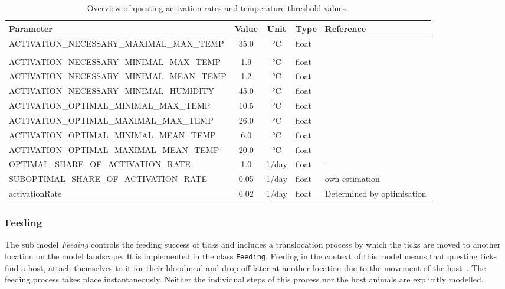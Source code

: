 \documentclass[a4paper, 11pt]{scrartcl}
\newcommand{\inlinecode}[1]{\texttt{\small #1}}
\begin{document}
\begin{table}[h!]
\caption[Overview of questing activation rates and temperature threshold values.]{Overview of questing activation rates and temperature threshold values.}
\label{tab:activation_parameters}
\begin{tabularx}{\textwidth}{lccll}
\toprule
\textbf{Parameter}	& \textbf{Value} & \textbf{Unit}	& \textbf{Type}	& \textbf{Reference} \\
\midrule
\multirow{2}{*}{\tiny{ACTIVATION\_NECESSARY\_MAXIMAL\_MAX\_TEMP}}	& \multirow{2}{*}{35.0}  & \multirow{2}{*}{°C} & \multirow{2}{*}{float} & ~\cite{Gray.2016} \\
												    &		&	 &		 & \textcite{MacLeod.1935} \\
\tiny{ACTIVATION\_NECESSARY\_MINIMAL\_MAX\_TEMP}	&  1.9  & °C & float & \textcite{Perret.2000} \\
\tiny{ACTIVATION\_NECESSARY\_MINIMAL\_MEAN\_TEMP}&  1.2 	& °C & float & \textcite{Perret.2000} \\
\tiny{ACTIVATION\_NECESSARY\_MINIMAL\_HUMIDITY}	& 45.0  & °C & float & \textcite{Greenfield.2011} \\
\tiny{ACTIVATION\_OPTIMAL\_MINIMAL\_MAX\_TEMP}	& 10.5 	& °C & float & \textcite{Perret.2000} \\
\tiny{ACTIVATION\_OPTIMAL\_MAXIMAL\_MAX\_TEMP}	& 26.0  & °C & float & \textcite{Greenfield.2011} \\
\tiny{ACTIVATION\_OPTIMAL\_MINIMAL\_MEAN\_TEMP}	&  6.0  & °C & float & \textcite{Gilbert.2014}	\\
\tiny{ACTIVATION\_OPTIMAL\_MAXIMAL\_MEAN\_TEMP}	& 20.0 	& °C & float & \tiny{\textcite{Kubiak.2006}} \\
\midrule
\tiny{OPTIMAL\_SHARE\_OF\_ACTIVATION\_RATE}		&  1.0  & 1/day & float	& - \\
\tiny{SUBOPTIMAL\_SHARE\_OF\_ACTIVATION\_RATE}	&  0.05	& 1/day & float	& own estimation \\
\small{activationRate}	   						&  0.02 & 1/day & float	& \small{Determined by optimisation} \\
\bottomrule
\end{tabularx}
\end{table}

\subsubsection{Feeding}\label{feeding}
The sub model \emph{Feeding} controls the feeding success of ticks and includes a translocation process by which the ticks are moved to another location on the model landscape. It is implemented in the class \inlinecode{Feeding}. Feeding in the context of this model means that questing ticks find a host, attach themselves to it for their bloodmeal and drop off later at another location due to the movement of the host~\parencite{Medlock.2013}. The feeding process takes place instantaneously. Neither the individual steps of this process nor the host animals are explicitly modelled.
\end{document}

